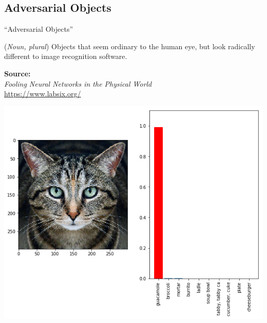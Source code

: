 \documentclass[aspectratio=169,x11names]{beamer}
\begin{document}

\subsection{Adversarial Objects}
\begin{frame}
\begin{center}
\huge
``Adversarial Objects''
\end{center}
\bigskip
\normalsize

(\textit{Noun, plural}) Objects that seem ordinary to the human eye, but look radically different to image recognition software.
\bigskip

\begin{center}
\textbf{Source:}\\
\emph{Fooling Neural Networks in the Physical World}\\
\url{https://www.labsix.org/}
\end{center}
\end{frame}

\begin{frame}
\begin{center}
\includegraphics[height=\textheight]{images/cat_adversarial.png} 
\end{center}
\end{frame}
\end{document}
